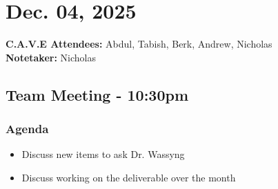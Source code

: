 	\pagebreak
	\section*{Dec. 04, 2025}

	\textbf{C.A.V.E Attendees:} Abdul, Tabish, Berk, Andrew, Nicholas\\
	\textbf{Notetaker:} Nicholas

	\subsection*{Team Meeting - 10:30pm}
		\subsubsection*{Agenda}
			\begin{itemize}
				\item Discuss new items to ask Dr. Wassyng
				\item Discuss working on the deliverable over the month
			\end{itemize}

